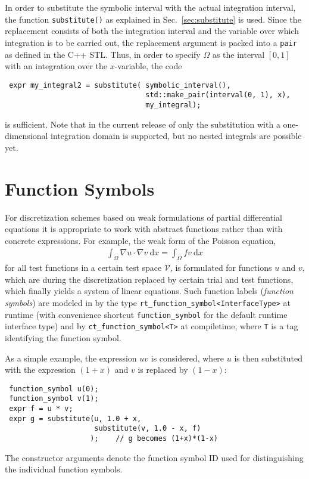 In order to substitute the symbolic interval with the actual integration interval, the function \lstinline|substitute()| as explained in Sec.~\ref{sec:substitute} is used.
Since the replacement consists of both the integration interval and the variable over which integration is to be carried out, the replacement argument is packed into a \lstinline|pair| as defined in the C++ STL. Thus, in order to specify $\Omega$ as the interval $[0,1]$ with an integration over the $x$-variable, the code
\begin{lstlisting}
 expr my_integral2 = substitute( symbolic_interval(),
                                 std::make_pair(interval(0, 1), x),
                                 my_integral);
\end{lstlisting}
is sufficient. Note that in the current release of {\ViennaMath} only the substitution with a one-dimensional integration domain is supported, but no nested integrals are possible yet.



  \section{Function Symbols} \label{sec:function-symbols}
For discretization schemes based on weak formulations of partial differential equations it is appropriate to work with abstract functions rather than with concrete expressions.
For example, the weak form of the Poisson equation,
\begin{align} \label{eq:weak-poisson}
 \int_\Omega \nabla u \cdot \nabla v \: \mathrm{d} x = \int_\Omega fv \: \mathrm{d} x 
\end{align}
for all test functions in a certain test space $\mathcal{V}$, is formulated for functions $u$ and $v$, which are during the discretization replaced by certain trial and test functions, which finally yields a system of linear equations. 
Such function labels (\emph{function symbols}) are modeled in {\ViennaMath} by the type \lstinline|rt_function_symbol<InterfaceType>| at runtime (with convenience shortcut \lstinline|function_symbol| for the default runtime interface type) and by \lstinline|ct_function_symbol<T>| at compiletime, where \lstinline|T| is a tag identifying the function symbol.

As a simple example, the expression $uv$ is considered, where $u$ is then substituted with the expression $(1+x)$ and $v$ is replaced by $(1-x)$:
\begin{lstlisting}
 function_symbol u(0);
 function_symbol v(1);
 expr f = u * v;
 expr g = substitute(u, 1.0 + x,
                     substitute(v, 1.0 - x, f)
                    );    // g becomes (1+x)*(1-x)
\end{lstlisting}
The constructor arguments denote the function symbol ID used for distinguishing the individual function symbols.

